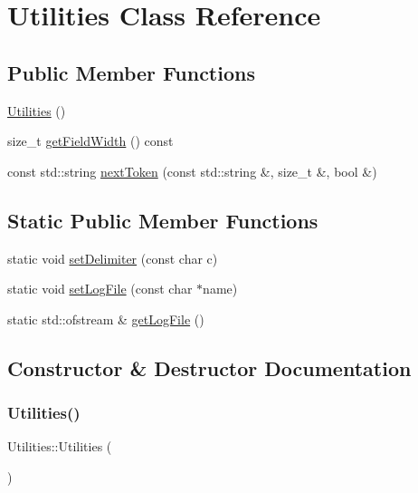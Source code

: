 \hypertarget{classUtilities}{}\section{Utilities Class Reference}
\label{classUtilities}
\subsection*{Public Member Functions}
\begin{DoxyCompactItemize}
\item 
\mbox{\hyperlink{classUtilities_ab1676c9ce35cf347a73d16f1094e1271}{Utilities}} ()
\item 
size\+\_\+t \mbox{\hyperlink{classUtilities_a94abc3ceade71097979e76e15008efba}{get\+Field\+Width}} () const
\item 
const std\+::string \mbox{\hyperlink{classUtilities_a59c27deae1e3810d8591b35ed90b7f33}{next\+Token}} (const std\+::string \&, size\+\_\+t \&, bool \&)
\end{DoxyCompactItemize}
\subsection*{Static Public Member Functions}
\begin{DoxyCompactItemize}
\item 
static void \mbox{\hyperlink{classUtilities_a833c24f770f9bd4c128cfc9dabb60a29}{set\+Delimiter}} (const char c)
\item 
static void \mbox{\hyperlink{classUtilities_a63a49d3b5ff70602f519d045234e7992}{set\+Log\+File}} (const char $\ast$name)
\item 
static std\+::ofstream \& \mbox{\hyperlink{classUtilities_aecd7de50b27a709a9810b17940074cad}{get\+Log\+File}} ()
\end{DoxyCompactItemize}


\subsection{Constructor \& Destructor Documentation}
\mbox{\label{classUtilities_ab1676c9ce35cf347a73d16f1094e1271}} 
\subsubsection{\texorpdfstring{Utilities()}{Utilities()}}
{\footnotesize\ttfamily Utilities\+::\+Utilities (\begin{DoxyParamCaption}{ }\end{DoxyParamCaption})}

